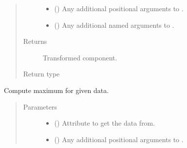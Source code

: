 \documentclass[letterpaper,10pt,english]{sphinxmanual}
\begin{document}
\begin{fulllineitems}
\begin{fulllineitems}
\begin{quote}
\begin{description}
\begin{itemize}
\item {} 
 () \textendash{} Any additional positional arguments to .

\item {} 
 () \textendash{} Any additional named arguments to .

\end{itemize}

\item[{Returns}] \leavevmode
{} \textendash{} Transformed component.

\item[{Return type}] \leavevmode
{\hyperref[\detokenize{api/base_classes:geology.src.base_spatial.SpatialComponent}]{}}

\end{description}\end{quote}

\end{fulllineitems}


\begin{fulllineitems}
\label{\detokenize{api/states:geology.src.States.maximum}}
Compute maximum for given data.
\begin{quote}\begin{description}
\item[{Parameters}] \leavevmode\begin{itemize}
\item {} 
 (\sphinxstyleliteralemphasis{\sphinxupquote{, }}) \textendash{} Attribute to get the data from.

\item {} 
 () \textendash{} Any additional positional arguments to .


\end{itemize}
\end{description}
\end{quote}
\end{fulllineitems}
\end{fulllineitems}
\end{document}
